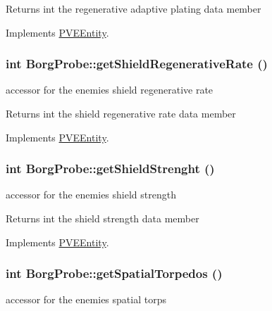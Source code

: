 \begin{DoxyReturn}{Returns}
int the regenerative adaptive plating data member 
\end{DoxyReturn}


Implements \hyperlink{classPVEEntity}{PVEEntity}.

\hypertarget{classBorgProbe_a0bd8db46345776e54af6c198fb4a5c3b}{
\subsubsection[{getShieldRegenerativeRate}]{\setlength{\rightskip}{0pt plus 5cm}int BorgProbe::getShieldRegenerativeRate ()}}
\label{db/deb/classBorgProbe_a0bd8db46345776e54af6c198fb4a5c3b}
accessor for the enemies shield regenerative rate

\begin{DoxyReturn}{Returns}
int the shield regenerative rate data member 
\end{DoxyReturn}


Implements \hyperlink{classPVEEntity}{PVEEntity}.

\hypertarget{classBorgProbe_a06fb45579883333083eda36335ef7349}{
\subsubsection[{getShieldStrenght}]{\setlength{\rightskip}{0pt plus 5cm}int BorgProbe::getShieldStrenght ()}}
\label{db/deb/classBorgProbe_a06fb45579883333083eda36335ef7349}
accessor for the enemies shield strength

\begin{DoxyReturn}{Returns}
int the shield strength data member 
\end{DoxyReturn}


Implements \hyperlink{classPVEEntity}{PVEEntity}.

\hypertarget{classBorgProbe_aaa3c141850bd6d15e6d8eab68d75583c}{
\subsubsection[{getSpatialTorpedos}]{\setlength{\rightskip}{0pt plus 5cm}int BorgProbe::getSpatialTorpedos ()}}
\label{db/deb/classBorgProbe_aaa3c141850bd6d15e6d8eab68d75583c}
accessor for the enemies spatial torps

